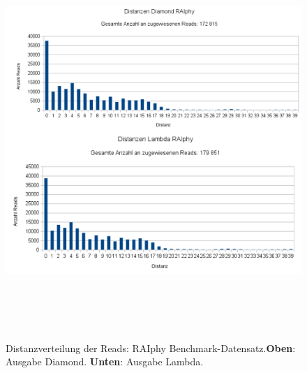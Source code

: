 \documentclass[10pt, a4paper]{report}[08.12.2015]
\begin{document}
    
     \begin{figure}[H]
      \centering
      \noindent\includegraphics[width=\linewidth,height=15cm,
      keepaspectratio]{Abbildungen/RAIphy_Distanzen_both.png}
      \caption[Distanzverteilung der Reads: RAIphy Benchmark-Datensatz.]{\small{Distanzverteilung der Reads: RAIphy Benchmark-Datensatz.\newline \textbf{Oben}: Ausgabe Diamond. \textbf{Unten}: Ausgabe Lambda.}}
      \label{fig:raiphy}
    \end{figure}
\end{document}
